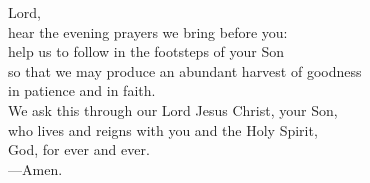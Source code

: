 \prayer


\begin{prayerverse}
Lord,\\
hear the evening prayers we bring before you:\\
help us to follow in the footsteps of your Son\\
so that we may produce an abundant harvest of goodness\\
in patience and in faith.\\
We ask this through our Lord Jesus Christ, your Son,\\
who lives and reigns with you and the Holy Spirit,\\
God, for ever and ever.\\
{\color{red}---\thinspace}Amen.
\end{prayerverse}

